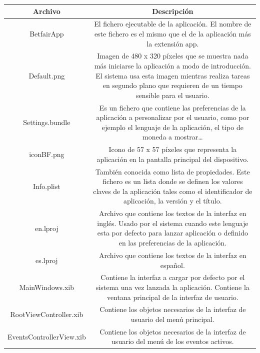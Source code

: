 \tablelasttail{\\}
\begin{supertabular}{||c|c||}
\hline 
{}Archivo & Descripción\\ 
\hline 
BetfairApp & El fichero ejecutable de la aplicación. El nombre de este fichero es el mismo que el de la aplicación más la extensión app.\\ 
\hline 
Default.png & Imagen de 480 x 320 píxeles que se muestra nada más iniciarse la aplicación  a modo de introducción. El sistema usa esta imagen mientras realiza tareas en segundo plano que requieren de un tiempo sensible para el usuario.\\
\hline
Settings.bundle & Es un fichero que contiene las preferencias de la aplicación a personalizar por el usuario, como por ejemplo el lenguaje de la aplicación, el tipo de moneda a mostrar\ldots \\
\hline
iconBF.png & Icono de 57 x 57 píxeles que representa la aplicación en la pantalla principal del dispositivo. \\
\hline
Info.plist & También conocida como lista de propiedades. Este fichero es un lista donde se definen los valores claves de la aplicación tales como el identificador de aplicación, la versión y el título.\\
\hline
en.lproj & Archivo que contiene los textos de la interfaz en inglés. Usado por el sistema cuando este lenguaje esta por defecto para lanzar aplicación o definido en las preferencias de la aplicación.\\
\hline
es.lproj &Archivo que contiene los textos de la interfaz en español.\\
\hline
MainWindows.xib & Contiene la interfaz a cargar por defecto por el sistema una vez lanzada la aplicación. Contiene la ventana principal de la interfaz de usuario. \\
\hline
RootViewController.xib & Contiene los objetos necesarios de la interfaz de usuario del menú principal. \\
\hline
EventsControllerView.xib &Contiene los objetos necesarios de la interfaz de usuario del menú de los eventos activos. \\

\end{supertabular}
